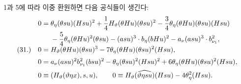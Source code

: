 
1과 5에 따라 이중 환원하면 다음 공식들이 생긴다:
\[
\begin{array}{@{}r@{\quad}l@{}}
&\displaystyle
\begin{aligned}
0={}&\theta_\eta(\theta su)(Hsu)^2+\frac14H_\vartheta(\theta Hu)(\theta su)^2-\frac34\theta_\eta(\theta Hu)(\theta su)(Hsu)\\
&-\frac54\theta_\eta(\theta Hu)^2(\theta su)-(asu)^3\cdot b_\eta(bHu)^2-a_\nu(asu)^3\cdot b_{\nu_1}^2,
\end{aligned}\\[0.55em]
(31.)&\displaystyle 0=H_\vartheta(\theta Hu)(\theta su)^3-7\theta_\eta(\theta Hu)(\theta su)^2(Hsu),\\[0.55em]
&\displaystyle 0=a_\nu(asu)^2b_{\nu_1}^{2}(bsu)^2-\theta_\eta(\theta su)^2(Hsu)^2+6\theta_\eta(\theta Hu)(\theta su)^2(Hsu),\\[0.55em]
&\displaystyle 0\equiv (H_\vartheta(\vartheta\eta x),s,u),\qquad
0\equiv H_\vartheta(\widehat{\vartheta\eta su})(Hsu)-4\theta_\eta^2(Hsu).
\end{array}
\]

